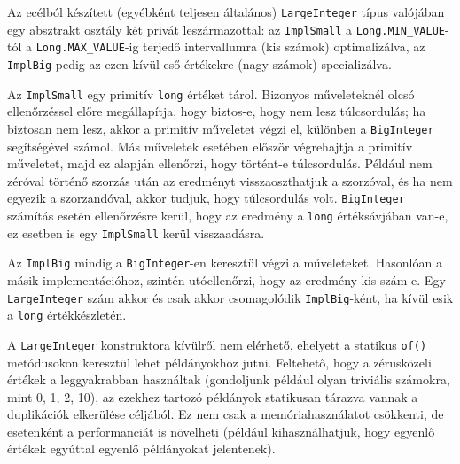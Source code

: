 \documentclass[
    parspace,
    noindent,
    nohyp,
]{elteiktdk}[2023/04/10]
\begin{document}
Az ecélból készített (egyébként teljesen általános) \texttt{LargeInteger} típus
valójában egy absztrakt osztály két privát leszármazottal:
az \texttt{ImplSmall} a \texttt{Long.MIN\_VALUE}-tól a \texttt{Long.MAX\_VALUE}-ig
terjedő intervallumra (kis számok) optimalizálva,
az \texttt{ImplBig} pedig az ezen kívül eső értékekre (nagy számok) specializálva.

Az \texttt{ImplSmall} egy primitív \texttt{long} értéket tárol.
Bizonyos műveleteknél olcsó ellenőrzéssel előre megállapítja,
hogy biztos-e, hogy nem lesz túlcsordulás;
ha biztosan nem lesz, akkor a primitív műveletet végzi el,
különben a \texttt{BigInteger} segítségével számol.
Más műveletek esetében először végrehajtja a primitív műveletet,
majd ez alapján ellenőrzi, hogy történt-e túlcsordulás.
Például nem zéróval történő szorzás után az eredményt visszaoszthatjuk a szorzóval,
és ha nem egyezik a szorzandóval, akkor tudjuk, hogy túlcsordulás volt.
\texttt{BigInteger} számítás esetén ellenőrzésre kerül,
hogy az eredmény a \texttt{long} értéksávjában van-e,
ez esetben is egy \texttt{ImplSmall} kerül visszaadásra.

Az \texttt{ImplBig} mindig a \texttt{BigInteger}-en keresztül végzi a műveleteket.
Hasonlóan a másik implementációhoz, szintén utóellenőrzi, hogy az eredmény kis szám-e.
Egy \texttt{LargeInteger} szám akkor és csak akkor csomagolódik \texttt{ImplBig}-ként,
ha kívül esik a \texttt{long} értékkészletén.

A \texttt{LargeInteger} konstruktora kívülről nem elérhető,
ehelyett a statikus \texttt{of()} metódusokon keresztül lehet példányokhoz jutni.
Feltehető, hogy a zérusközeli értékek a leggyakrabban használtak
(gondoljunk például olyan triviális számokra, mint 0, 1, 2, 10),
az ezekhez tartozó példányok statikusan tárazva vannak a duplikációk elkerülése céljából.
Ez nem csak a memóriahasználatot csökkenti,
de esetenként a performanciát is növelheti
(például kihasználhatjuk, hogy egyenlő értékek egyúttal egyenlő példányokat jelentenek).
\end{document}
